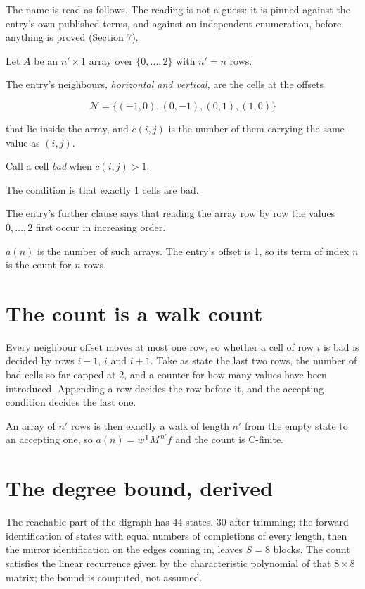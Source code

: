 \documentclass[11pt]{article}
\theoremstyle{definition}
\begin{document}
The name is read as follows. The reading is not a guess: it is pinned against the entry's own published terms, and against an independent enumeration, before anything is proved (Section 7).

Let $A$ be an $n' \times 1$ array over $\{0,\dots,2\}$ with $n' = n$ rows.

The entry's neighbours, {\itshape horizontal and vertical}, are the cells at the offsets

\[\mathcal{N} = \{(-1,0), (0,-1), (0,1), (1,0)\}\]

that lie inside the array, and $c(i,j)$ is the number of them carrying the same value as $(i,j)$.

Call a cell {\itshape bad} when $c(i,j) > 1$.

The condition is that exactly 1 cells are bad.

The entry's further clause says that reading the array row by row the values $0,\dots,2$ first occur in increasing order.

$a(n)$ is the number of such arrays. The entry's offset is 1, so its term of index $n$ is the count for $n$ rows.

\section{The count is a walk count}

Every neighbour offset moves at most one row, so whether a cell of row $i$ is bad is decided by rows $i-1$, $i$ and $i+1$. Take as state the last two rows, the number of bad cells so far capped at 2, and a counter for how many values have been introduced. Appending a row decides the row before it, and the accepting condition decides the last one.

An array of $n'$ rows is then exactly a walk of length $n'$ from the empty state to an accepting one, so $a(n) = w^{\mathsf T}M^{\,n'}f$ and the count is C-finite.

\section{The degree bound, derived}

The reachable part of the digraph has $44$ states, $30$ after trimming; the forward identification of states with equal numbers of completions of every length, then the mirror identification on the edges coming in, leaves $S = 8$ blocks. The count satisfies the linear recurrence given by the characteristic polynomial of that $8\times8$ matrix; the bound is computed, not assumed.
\end{document}
